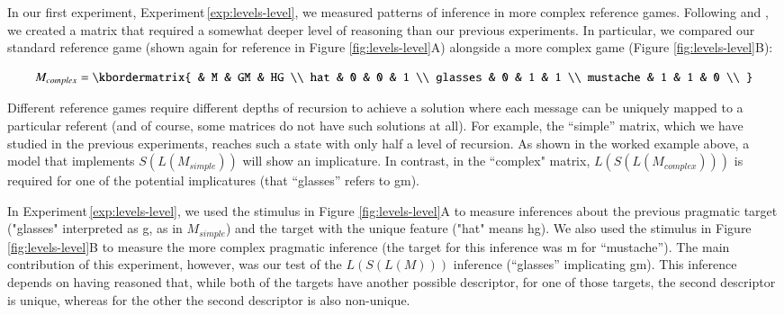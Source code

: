 \documentclass[man,noapacite]{apa2}
\newcounter{Experiment}
\newcommand{\exptref}[1]{Experiment\,\ref{#1}}
\begin{document}
In our first experiment, \exptref{exp:levels-level}, we measured patterns of inference in more complex reference games. Following  and , we created a matrix that required a somewhat deeper level of reasoning than our previous experiments. In particular, we compared our standard reference game (shown again for reference in Figure \ref{fig:levels-level}A) alongside a more complex game (Figure \ref{fig:levels-level}B):

\begin{equation}
    M_{complex} = \kbordermatrix{
      & M & GM & HG \\
      hat & 0 & 0 & 1  \\
      glasses & 0 & 1 & 1 \\
      mustache & 1 & 1 & 0 \\
    }
\end{equation}

Different reference games require different depths of recursion to achieve a solution where each message can be uniquely mapped to a particular referent (and of course, some matrices do not have such solutions at all). For example, the ``simple'' matrix, which we have studied in the previous experiments, reaches such a state with only half a level of recursion. As shown in the worked example above, a model that implements $S(L(M_{simple}))$ will show an implicature. In contrast, in the ``complex" matrix, $L(S(L(M_{complex})))$ is required for one of the potential implicatures (that ``glasses'' refers to {\sc gm}).


In \exptref{exp:levels-level}, we used the stimulus in Figure \ref{fig:levels-level}A to measure inferences about the previous pragmatic target ("glasses" interpreted as {\sc g}, as in $M_{simple}$) and the target with the unique feature ("hat" means {\sc hg}). We also used the stimulus in Figure \ref{fig:levels-level}B to measure the more complex pragmatic inference (the target for this inference was {\sc m} for ``mustache''). The main contribution of this experiment, however, was our test of the $L(S(L(M)))$ inference (``glasses'' implicating {\sc gm}). This inference depends on having reasoned that, while both of the targets have another possible descriptor, for one of those targets, the second descriptor is unique, whereas for the other the second descriptor is also non-unique.
\end{document}
